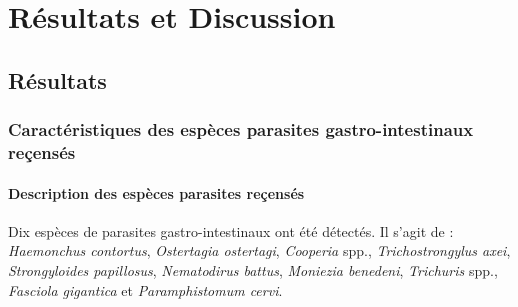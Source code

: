 \chapter{Résultats et Discussion}

\section{Résultats}
\subsection{Caractéristiques des espèces parasites gastro-intestinaux reçensés}
\subsubsection{Description des espèces parasites reçensés}
Dix espèces de parasites gastro-intestinaux ont été détectés. Il s’agit de : \textit{Haemonchus
contortus}, \textit{Ostertagia ostertagi}, \textit{Cooperia} spp., \textit{Trichostrongylus axei}, \textit{Strongyloides papillosus}, \textit{Nematodirus battus}, \textit{Moniezia benedeni}, \textit{Trichuris} spp., \textit{Fasciola gigantica} et \textit{Paramphistomum cervi}.

